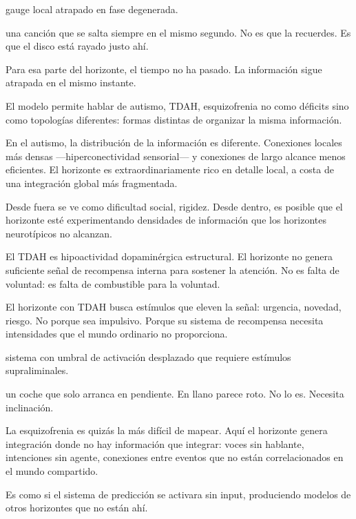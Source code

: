 \begin{fisica}
 gauge local atrapado en fase degenerada.

 una canción que se salta siempre en el mismo segundo. No es que la recuerdes. Es que el disco está rayado justo ahí.
\end{fisica}
Para esa parte del horizonte, el tiempo no ha pasado. La información sigue atrapada en el mismo instante.

\noindent El modelo permite hablar de autismo, TDAH, esquizofrenia no como déficits sino como topologías diferentes: formas distintas de organizar la misma información.

En el autismo, la distribución de la información es diferente. Conexiones locales más densas —hiperconectividad sensorial— y conexiones de largo alcance menos eficientes. El horizonte es extraordinariamente rico en detalle local, a costa de una integración global más fragmentada.

Desde fuera se ve como dificultad social, rigidez. Desde dentro, es posible que el horizonte esté experimentando densidades de información que los horizontes neurotípicos no alcanzan.

El TDAH es hipoactividad dopaminérgica estructural. El horizonte no genera suficiente señal de recompensa interna para sostener la atención. No es falta de voluntad: es falta de combustible para la voluntad.

El horizonte con TDAH busca estímulos que eleven la señal: urgencia, novedad, riesgo. No porque sea impulsivo. Porque su sistema de recompensa necesita intensidades que el mundo ordinario no proporciona.

\begin{fisica}
 sistema con umbral de activación desplazado que requiere estímulos supraliminales.

 un coche que solo arranca en pendiente. En llano parece roto. No lo es. Necesita inclinación.
\end{fisica}
La esquizofrenia es quizás la más difícil de mapear. Aquí el horizonte genera integración donde no hay información que integrar: voces sin hablante, intenciones sin agente, conexiones entre eventos que no están correlacionados en el mundo compartido.

Es como si el sistema de predicción se activara sin input, produciendo modelos de otros horizontes que no están ahí.

